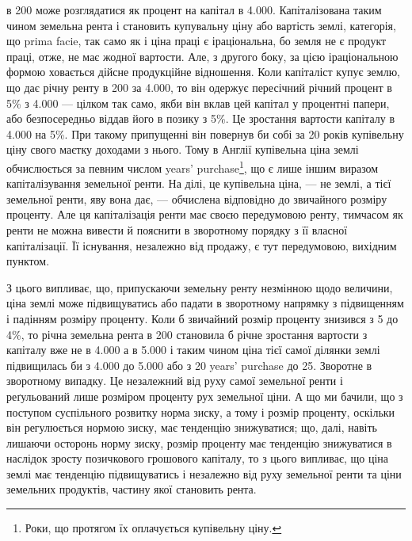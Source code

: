 \parcont{}  %
в 200 може розглядатися як процент на капітал в \num{4.000}. Капіталізована
таким чином земельна рента і становить купувальну ціну або вартість землі,
категорія, що prima facie, так само як і ціна праці є іраціональна, бо земля не є продукт
праці, отже, не має жодної вартости. Але, з другого боку, за цією іраціональною
формою ховається дійсне продукційне відношення. Коли капіталіст купує
землю, що дає річну ренту в 200 за \num{4.000}, то він одержує пересічний річний
процент в 5\% з \num{4.000} — цілком так само, якби він вклав цей капітал у
процентні папери, або безпосередньо віддав його в позику з 5\%. Це зростання вартости
капіталу в \num{4.000} на 5\%. При такому припущенні він повернув би собі
за 20 років купівельну ціну свого маєтку доходами з нього. Тому в Англії купівельна
ціна землі обчислюється за певним числом years’ purchase\footnote*{
Роки, що протягом їх оплачується купівельну ціну. 
}, що є лише іншим
виразом капіталізування земельної ренти. На ділі, це купівельна ціна, — не
землі, а тієї земельної ренти, яву вона дає, — обчислена відповідно до звичайного
розміру проценту. Але ця капіталізація ренти має своєю передумовою
ренту, тимчасом як ренти не можна вивести й пояснити в зворотному порядку
з її власної капіталізації. Її існування, незалежно від продажу, є тут
передумовою, вихідним пунктом.

З цього випливає, що, припускаючи земельну ренту незмінною щодо величини,
ціна землі може підвищуватись або падати в зворотному напрямку з
підвищенням і падінням розміру проценту. Коли б звичайний розмір проценту
знизився з 5 до 4\%, то річна земельна рента в 200 становила б річне
зростання вартости з капіталу вже не в \num{4.000} а в \num{5.000} і таким чином
ціна тієї самої ділянки землі підвищилась би з \num{4.000} до \num{5.000} або з 20 years’
purchase до 25. Зворотне в зворотному випадку. Це незалежний від руху самої
земельної ренти і реґульований лише розміром проценту рух земельної ціни.
А що ми бачили, що з поступом суспільного розвитку норма зиску, а тому і
розмір проценту, оскільки він регулюється нормою зиску, має тенденцію
знижуватися; що, далі, навіть лишаючи осторонь норму зиску, розмір проценту
має тенденцію знижуватися в наслідок зросту позичкового грошового капіталу,
то з цього випливає, що ціна землі має тенденцію підвищуватись і незалежно
від руху земельної ренти та ціни земельних продуктів, частину якої становить
рента.

